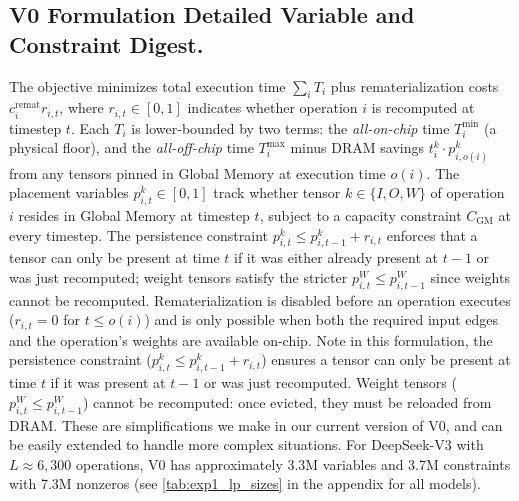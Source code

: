 \subsection{V0 Formulation Detailed Variable and Constraint Digest.}
The objective minimizes total execution time $\sum_i T_i$ plus rematerialization costs $c_i^{\text{remat}} r_{i,t}$, where $r_{i,t} \in [0,1]$ indicates whether operation $i$ is recomputed at timestep $t$.
Each $T_i$ is lower-bounded by two terms: the \emph{all-on-chip} time $T_i^{\min}$ (a physical floor), and the \emph{all-off-chip} time $T_i^{\max}$ minus DRAM savings $t_i^k \cdot p_{i,o(i)}^k$ from any tensors pinned in Global Memory at execution time $o(i)$.
The placement variables $p_{i,t}^k \in [0,1]$ track whether tensor $k \in \{I, O, W\}$ of operation $i$ resides in Global Memory at timestep $t$, subject to a capacity constraint $C_{\text{GM}}$ at every timestep.
The persistence constraint $p_{i,t}^k \leq p_{i,t-1}^k + r_{i,t}$ enforces that a tensor can only be present at time $t$ if it was either already present at $t{-}1$ or was just recomputed; weight tensors satisfy the stricter $p_{i,t}^W \leq p_{i,t-1}^W$ since weights cannot be recomputed.
Rematerialization is disabled before an operation executes ($r_{i,t} = 0$ for $t \leq o(i)$) and is only possible when both the required input edges and the operation's weights are available on-chip. Note in this formulation, the persistence constraint ($p_{i,t}^k \leq p_{i,t-1}^k + r_{i,t}$) ensures a tensor can only be present at time $t$ if it was present at $t{-}1$ or was just recomputed. Weight tensors ($p_{i,t}^W \leq p^W_{i,t-1}$) cannot be recomputed: once evicted, they must be reloaded from DRAM. These are simplifications we make in our current version of V0, and can be easily extended to handle more complex situations. For DeepSeek-V3 with $L \approx 6{,}300$ operations, V0 has approximately 3.3M variables and 3.7M constraints with 7.3M nonzeros (see \cref{tab:exp1_lp_sizes} in the appendix for all models).







